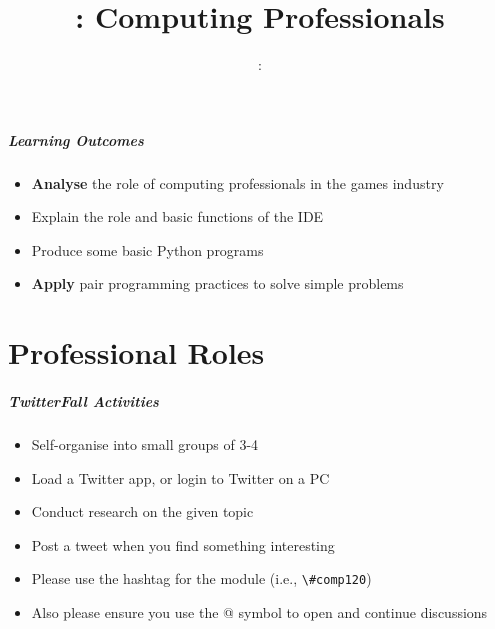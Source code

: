 \usepackage{../../beamerthemeFalmouthGamesAcademy}
\usepackage{multimedia}
\graphicspath{ {../../} }

\usepackage{textcomp}


\usepackage[normalem]{ulem}
\usepackage{wasysym}

\usepackage{pdfpages}

\usetikzlibrary{arrows,automata}







\title{\sessionnumber: Computing Professionals}
\subtitle{\modulecode: \moduletitle}

\frame{\titlepage} 

\begin{frame}
	\frametitle{Learning Outcomes}
	\begin{itemize}
		\item \textbf{Analyse} the role of computing professionals in the games industry
		\item Explain the role and basic functions of the IDE
		\item Produce some basic Python programs
		\item \textbf{Apply} pair programming practices to solve simple problems
	\end{itemize}
\end{frame}

\part{Professional Roles}
\frame{\partpage}

\begin{frame}
	\frametitle{TwitterFall Activities}
		
	\begin{itemize}
		\item Self-organise into small groups of 3-4
		\item Load a Twitter app, or login to Twitter on a PC
		\item Conduct research on the given topic
		\item Post a tweet when you find something interesting
	\end{itemize}

	\begin{itemize}
		\item Please use the hashtag for the module (i.e., \lstinline{\#comp120})
		\item Also please ensure you use the @ symbol to open and continue discussions
	\end{itemize}
\end{frame}

